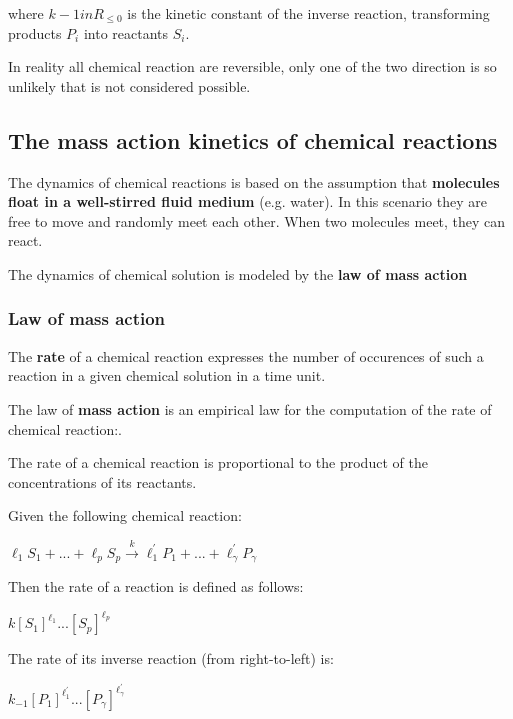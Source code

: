 where $k-1 in R_{\leq 0}$ is the kinetic constant of the inverse reaction, transforming products $P_i$ into reactants $S_i$.
\par In reality all chemical reaction are reversible, only one of the two direction is so unlikely that is not considered possible.

\subsection{The mass action kinetics of chemical reactions}
The dynamics of chemical reactions is based on the assumption that \textbf{molecules float in a well-stirred fluid medium} (e.g. water). In this scenario they are free to move and randomly meet each other. When two molecules meet, they can react.\par
The dynamics of chemical solution is modeled by the \textbf{law of mass action}

\subsubsection{Law of mass action}
The \textbf{rate} of a chemical reaction expresses the number of occurences of such a reaction in a given chemical solution in a time unit.\par
The law of \textbf{mass action} is an empirical law for the computation of the rate of chemical reaction:.\par

\begin{center}
    The rate of a chemical reaction is proportional to the product of the concentrations of its reactants.
\end{center}

Given the following chemical reaction:
\begin{center}
    $\ell_1 S_1 + ... + \ell_p S_p \xrightarrow{k} \ell^{'}_1 P_1 + ... + \ell^{'}_\gamma P_\gamma$
\end{center}

Then the rate of a reaction is defined as follows:
\begin{center}
    $k[S_{1}]^{\ell_{1}} ... [S_{p}]^{\ell_{p}}$
\end{center}

The rate of its inverse reaction (from right-to-left) is:
\begin{center}
    $k_{-1}[P_{1}]^{\ell^{'}_{1}} ... [P_{\gamma}]^{\ell^{'}_{\gamma}}$
\end{center}

